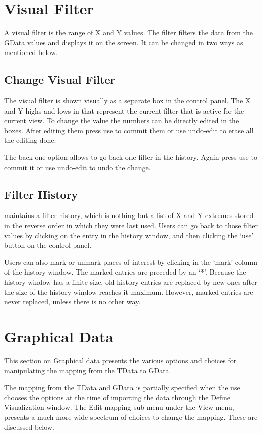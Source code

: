 \section{Visual Filter}

A visual filter is the range of X and Y values. The filter filters the
data from the GData values and displays it on the screen. It can be
changed in two ways as mentioned below.

\subsection{Change Visual Filter}

The visual filter is shown visually as a separate box in the control
panel. The X and Y highs and lows in that represent the current filter
that is active for the current view. To change the value the numbers
can be directly edited in the boxes. After editing them press use to
commit them or use undo-edit to erase all the editing done.

The back one option allows to go back one filter in the history. Again
press use to commit it or use undo-edit to undo the change.

\subsection{Filter History}

\Devise maintains a filter history, which is nothing but a list of X
and Y extremes stored in the reverse order in which they were last
used. Users can go back to those filter values by clicking on the
entry in the history window, and then clicking the `use' button on the
control panel.

Users can also mark or unmark places of interest by clicking in the
`mark' column of the history window. The marked entries are preceded
by an `*'.  Because the history window has a finite size, old history
entries are replaced by new ones after the size of the history window
reaches it maximum. However, marked entries are never replaced, unless
there is no other way.

\section{Graphical Data}

This section on Graphical data presents the various options and
choices for manipulating the mapping from the TData to GData.

The mapping from the TData and GData is partially specified when the
use chooses the options at the time of importing the data through the
Define Visualization window. The Edit mapping sub menu under the View
menu, presents a much more wide spectrum of choices to change the
mapping. These are discussed below.

